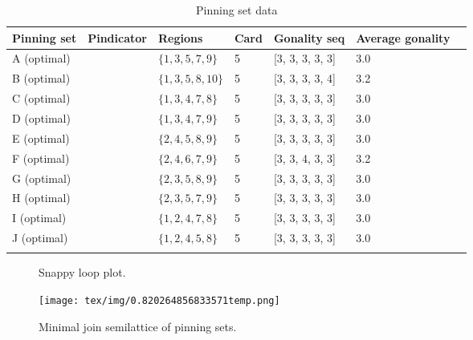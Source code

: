 \documentclass{article}%
\begin{document}
\begin{table}[ht]
	\caption{Pinning set data}
	\centering
	\renewcommand{\arraystretch}{1.5}
	\begin{tabularx}{\textwidth}{lXXXXXX}
		\toprule
			Pinning set & Pindicator & Regions & Card & Gonality seq & Average gonality\\
			\hline
			A (optimal) & {\Huge\textcolor{red0}{\textbullet}} & $\{1,3,5,7,9\}$ & 5 & [3, 3, 3, 3, 3] & 3.0 \\
			B (optimal) & {\Huge\textcolor{red1}{\textbullet}} & $\{1,3,5,8,10\}$ & 5 & [3, 3, 3, 3, 4] & 3.2 \\
			C (optimal) & {\Huge\textcolor{red2}{\textbullet}} & $\{1,3,4,7,8\}$ & 5 & [3, 3, 3, 3, 3] & 3.0 \\
			D (optimal) & {\Huge\textcolor{red3}{\textbullet}} & $\{1,3,4,7,9\}$ & 5 & [3, 3, 3, 3, 3] & 3.0 \\
			E (optimal) & {\Huge\textcolor{red4}{\textbullet}} & $\{2,4,5,8,9\}$ & 5 & [3, 3, 3, 3, 3] & 3.0 \\
			F (optimal) & {\Huge\textcolor{red5}{\textbullet}} & $\{2,4,6,7,9\}$ & 5 & [3, 3, 4, 3, 3] & 3.2 \\
			G (optimal) & {\Huge\textcolor{red6}{\textbullet}} & $\{2,3,5,8,9\}$ & 5 & [3, 3, 3, 3, 3] & 3.0 \\
			H (optimal) & {\Huge\textcolor{red7}{\textbullet}} & $\{2,3,5,7,9\}$ & 5 & [3, 3, 3, 3, 3] & 3.0 \\
			I (optimal) & {\Huge\textcolor{red8}{\textbullet}} & $\{1,2,4,7,8\}$ & 5 & [3, 3, 3, 3, 3] & 3.0 \\
			J (optimal) & {\Huge\textcolor{red9}{\textbullet}} & $\{1,2,4,5,8\}$ & 5 & [3, 3, 3, 3, 3] & 3.0 \\
		\bottomrule \\ 
	\end{tabularx}
\end{table}

\newpage

\begin{multicols}{2}
\begin{figure}[H]
\centering

\caption{Snappy loop plot.}
\label{fig:tex/img/0.24784845675760891temp.svg}
\end{figure}
\columnbreak

\begin{figure}[H]
\centering
\texttt{[image: tex/img/0.820264856833571temp.png]}
\caption{Minimal join semilattice of pinning sets.}
\label{fig:tex/img/0.820264856833571temp.png}
\end{figure}
\end{multicols}

\newpage
\end{document}
